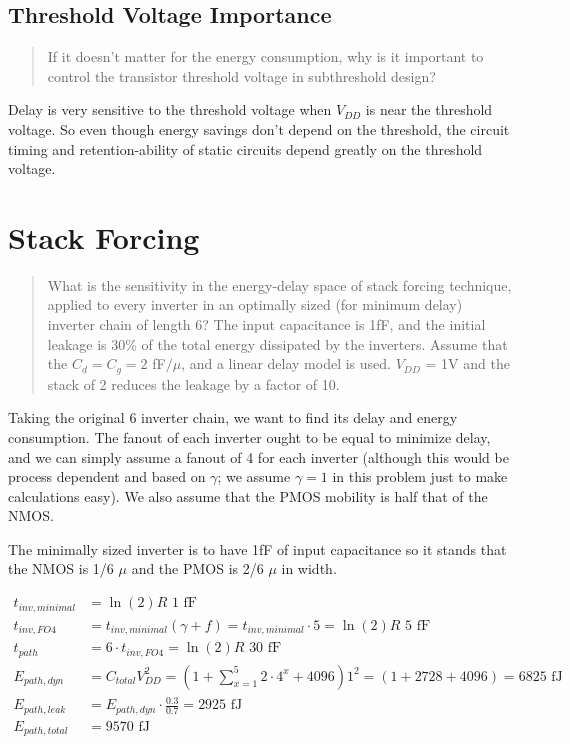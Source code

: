 \documentclass[11pt]{article}
\begin{document}
\subsection{Threshold Voltage Importance}
\begin{quote}
	If it doesn't matter for the energy consumption, why is it important to control the transistor threshold voltage in subthreshold design?
\end{quote}

Delay is very sensitive to the threshold voltage when $V_{DD}$ is near the threshold voltage. So even though energy savings don't depend on the threshold, the circuit timing and retention-ability of static circuits depend greatly on the threshold voltage.

\section{Stack Forcing}
\begin{quote}
	What is the sensitivity in the energy-delay space of stack forcing technique, applied to every inverter in an optimally sized (for minimum delay) inverter chain of length 6? The input capacitance is 1fF, and the initial leakage is 30\% of the total energy dissipated by the inverters. Assume that the $C_{d} = C_{g} = 2$ fF$/\mu$, and a linear delay model is used. $V_{DD}$ = 1V and the stack of 2 reduces the leakage by a factor of 10.
\end{quote}

Taking the original 6 inverter chain, we want to find its delay and energy consumption. The fanout of each inverter ought to be equal to minimize delay, and we can simply assume a fanout of 4 for each inverter (although this would be process dependent and based on $\gamma$; we assume $\gamma = 1$ in this problem just to make calculations easy). We also assume that the PMOS mobility is half that of the NMOS.

The minimally sized inverter is to have 1fF of input capacitance so it stands that the NMOS is 1/6 $\mu$ and the PMOS is 2/6 $\mu$ in width.

\begin{align}
	t_{inv,minimal} &= \ln(2) R \text{ 1 fF} \nonumber \\
	t_{inv,FO4} &= t_{inv,minimal} (\gamma + f) = t_{inv,minimal} \cdot 5 = \ln(2) R \text{ 5 fF} \nonumber \\
	t_{path} &= 6 \cdot t_{inv,FO4} = \ln(2) R \text{ 30 fF} \nonumber \\
	E_{path,dyn} &= C_{total} V_{DD}^2 = (1 + \sum_{x=1}^{5}2 \cdot 4^x + 4096) 1^2 = (1 + 2728 + 4096) = 6825 \text{ fJ} \nonumber \\
	E_{path,leak} &= E_{path,dyn} \cdot \frac{0.3}{0.7} = 2925 \text{ fJ}\nonumber \\
	E_{path,total} &= 9570 \text{ fJ} \nonumber
\end{align}
\end{document}
